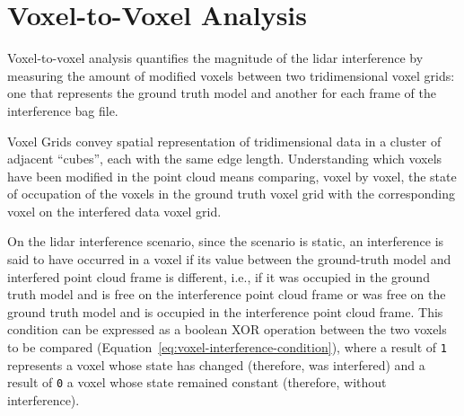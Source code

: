 



\section{Voxel-to-Voxel Analysis}
\label{sec:lidar-interference:voxel-analysis}
Voxel-to-voxel analysis quantifies the magnitude of the \ac{lidar} interference by measuring the amount of modified voxels between two tridimensional voxel grids: one that represents the ground truth model and another for each frame of the interference bag file.

Voxel Grids convey spatial representation of tridimensional data in a cluster of adjacent ``cubes'', each with the same edge length. Understanding which voxels have been modified in the point cloud means comparing, voxel by voxel, the state of occupation of the voxels in the ground truth voxel grid with the corresponding voxel on the interfered data voxel grid. 

On the \ac{lidar} interference scenario, since the scenario is static, an interference is said to have occurred in a voxel if its value between the ground-truth model and interfered point cloud frame is different, i.e., if it was occupied in the ground truth model and is free on the interference point cloud frame or was free on the ground truth model and is occupied in the interference point cloud frame. This condition can be expressed as a boolean XOR operation between the two voxels to be compared (Equation~\eqref{eq:voxel-interference-condition}), where a result of \texttt{1} represents a voxel whose state has changed (therefore, was interfered) and a result of \texttt{0} a voxel whose state remained constant (therefore, without interference).

